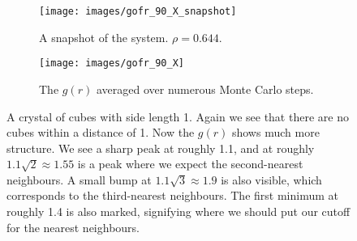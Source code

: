\documentclass[thesis]{subfiles}
\begin{document}
\begin{figure}[h]
	\begin{subfigure}{0.4\textwidth}
		\centering
		\texttt{[image: images/gofr\_90\_X\_snapshot]}
		\caption{A snapshot of the system. $\rho = 0.644$.}
	\end{subfigure}
	\begin{subfigure}{0.6\textwidth}
		\centering
		\texttt{[image: images/gofr\_90\_X]}
		\caption{The $g(r)$ averaged over numerous Monte Carlo steps.}
	\end{subfigure}
	\caption{A crystal of cubes with side length 1. Again we see that there are no cubes within a distance of 1. Now the $g(r)$ shows much more structure. We see a sharp peak at roughly 1.1, and at roughly $1.1 \sqrt 2 \approx 1.55$ is a peak where we expect the second-nearest neighbours. A small bump at $1.1 \sqrt 3 \approx 1.9$ is also visible, which corresponds to the third-nearest neighbours. The first minimum at roughly 1.4 is also marked, signifying where we should put our cutoff for the nearest neighbours.}
\end{figure}

\begin{comment}
\begin{minipage}{0.4\textwidth}
	\texttt{[image: images/gofr\_90\_l\_snapshot]}
\end{minipage}
\hfill
\begin{minipage}{0.6\textwidth}\raggedleft
	\texttt{[image: images/gofr\_90\_l]}
\end{minipage}
\end{comment}
\end{document}
